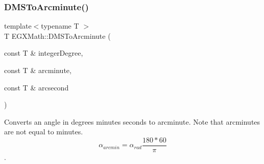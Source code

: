 \subsubsection{\texorpdfstring{D\+M\+S\+To\+Arcminute()}{DMSToArcminute()}}
{\footnotesize\ttfamily template$<$typename T $>$ \\
T E\+G\+X\+Math\+::\+D\+M\+S\+To\+Arcminute (\begin{DoxyParamCaption}\item[{const T \&}]{integer\+Degree,  }\item[{const T \&}]{arcminute,  }\item[{const T \&}]{arcsecond }\end{DoxyParamCaption})}



Converts an angle in degrees minutes seconds to arcminute. Note that arcminutes are not equal to minutes. \[\alpha_{arcmin}=\alpha_{rad}\frac{180 * 60}{\pi}\]. 


